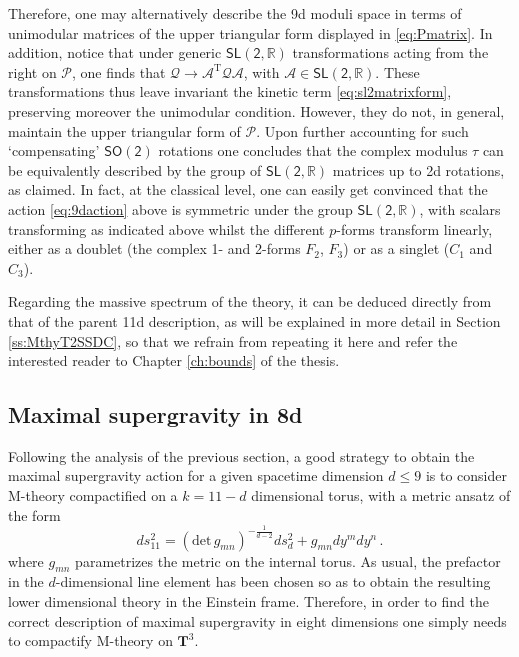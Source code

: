 Therefore, one may alternatively describe the 9d moduli space in terms of unimodular matrices of the upper triangular form displayed in \eqref{eq:Pmatrix}. In addition, notice that under generic $\mathsf{SL(2, \mathbb{R})}$ transformations acting from the right on $\mathcal{P}$, one finds that $\mathcal{Q} \to \mathcal{A}^{\text{T}} \mathcal{Q} \mathcal{A}$, with $\mathcal{A} \in \mathsf{SL(2, \mathbb{R})}$. These transformations thus leave invariant the kinetic term \eqref{eq:sl2matrixform}, preserving moreover the unimodular condition. However, they do not, in general, maintain the upper triangular form of $\mathcal{P}$. Upon further accounting for such `compensating' $\mathsf{SO(2)}$ rotations one concludes that the complex modulus $\tau$ can be equivalently described by the group of $\mathsf{SL(2, \mathbb{R})}$ matrices up to 2d rotations, as claimed. In fact, at the classical level, one can easily get convinced that the action \eqref{eq:9daction} above is symmetric under the group $\mathsf{SL(2, \mathbb{R})}$, with scalars transforming as indicated above whilst the different $p$-forms transform linearly, either as a doublet (the complex 1- and 2-forms $F_2$, $F_3$) or as a singlet ($C_1$ and $C_3$).

Regarding the massive spectrum of the theory, it can be deduced directly from that of the parent 11d description, as will be explained in more detail in Section \ref{ss:MthyT2SSDC}, so that we refrain from repeating it here and refer the interested reader to Chapter \ref{ch:bounds} of the thesis.

\subsection{Maximal supergravity in 8d}\label{ss:8dmaxsugra}

Following the analysis of the previous section, a good strategy to obtain the maximal supergravity action for a given spacetime dimension $d\leq 9$ is to consider M-theory compactified on a $k=11-d$ dimensional torus, with a metric ansatz of the form 
%
\begin{equation}\label{eq:torusmetric}
	ds^2_{11} = \left(\text{det}\, g_{mn}\right)^{-\frac{1}{d-2}} ds_d^2 + g_{mn} dy^m dy^n\, .
\end{equation}
%
where $g_{mn}$ parametrizes the metric on the internal torus. As usual, the prefactor in the $d$-dimensional line element has been chosen so as to obtain the resulting lower dimensional theory in the Einstein frame. Therefore, in order to find the correct description of maximal supergravity in eight dimensions one simply needs to compactify M-theory on $\mathbf{T}^3$.

